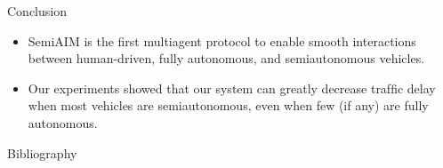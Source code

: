 \documentclass{beamer}
\begin{document}
\begin{frame}{Conclusion}
\begin{itemize}
\item SemiAIM is the first multiagent protocol to enable smooth interactions
between human-driven, fully autonomous, and semiautonomous
vehicles.\pause
\item Our experiments showed that our system can greatly decrease
trafﬁc delay when most vehicles are semiautonomous, even when few
(if any) are fully autonomous.
\end{itemize}
\end{frame}

\begin{frame}{Bibliography}
\tiny{
}
\end{frame}
\end{document}
